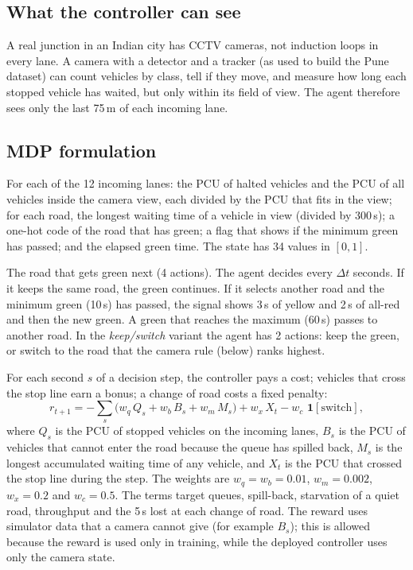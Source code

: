 \subsection{What the controller can see}
A real junction in an Indian city has CCTV cameras, not induction loops in every lane. A camera
with a detector and a tracker (as used to build the Pune dataset) can count vehicles by class,
tell if they move, and measure how long each stopped vehicle has waited, but only within its field
of view. The agent therefore sees only the last 75\,m of each incoming lane.

\subsection{MDP formulation}
\begin{description}[leftmargin=1.6cm,style=nextline]
  \item[State] For each of the 12 incoming lanes: the PCU of halted vehicles and the PCU of all
        vehicles inside the camera view, each divided by the PCU that fits in the view; for each
        road, the longest waiting time of a vehicle in view (divided by 300\,s); a one-hot code of
        the road that has green; a flag that shows if the minimum green has passed; and the
        elapsed green time. The state has 34 values in $[0,1]$.
  \item[Action] The road that gets green next (4 actions). The agent decides every $\Delta t$
        seconds. If it keeps the same road, the green continues. If it selects another road and the
        minimum green (10\,s) has passed, the signal shows 3\,s of yellow and 2\,s of all-red and
        then the new green. A green that reaches the maximum (60\,s) passes to another road.
        In the \emph{keep/switch} variant the agent has 2 actions: keep the green, or switch to the
        road that the camera rule (below) ranks highest.
  \item[Reward] For each second $s$ of a decision step, the controller pays a cost; vehicles that
        cross the stop line earn a bonus; a change of road costs a fixed penalty:
        \begin{equation}
        r_{t+1} = -\sum_{s}\Big(w_q\,Q_s + w_b\,B_s + w_m\,M_s\Big) + w_x\,X_t - w_c\,\,\mathbf{1}[\text{switch}],
        \end{equation}
        where $Q_s$ is the PCU of stopped vehicles on the incoming lanes, $B_s$ is the PCU of
        vehicles that cannot enter the road because the queue has spilled back, $M_s$ is the
        longest accumulated waiting time of any vehicle, and $X_t$ is the PCU that crossed the stop
        line during the step. The weights are $w_q=w_b=0.01$, $w_m=0.002$, $w_x=0.2$ and
        $w_c=0.5$. The terms target queues, spill-back, starvation of a quiet road, throughput and
        the 5\,s lost at each change of road. The reward uses simulator data that a camera cannot
        give (for example $B_s$); this is allowed because the reward is used only in training,
        while the deployed controller uses only the camera state.
\end{description}

